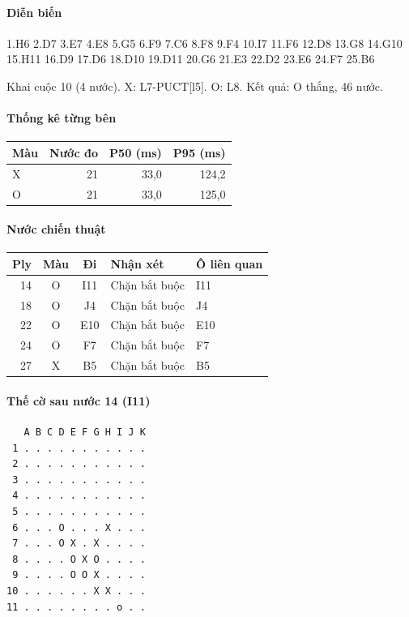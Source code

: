 \paragraph{Diễn biến}
{\footnotesize 1.H6 2.D7 3.E7 4.E8 5.G5 6.F9 7.C6 8.F8 9.F4 10.I7 11.F6 12.D8 13.G8 14.G10 15.H11 16.D9 17.D6 18.D10 19.D11 20.G6 21.E3 22.D2 23.E6 24.F7 25.B6\par}
Khai cuộc 10 (4 nước). X: L7-PUCT[l5]. O: L8. Kết quả: O thắng, 46 nước.
\paragraph{Thống kê từng bên}
\begin{center}\small
\begin{tabular}{@{}lrrr@{}}
\toprule
Màu & Nước đo & P50 (ms) & P95 (ms) \\
\midrule
X & 21 & 33,0 & 124,2 \\
O & 21 & 33,0 & 125,0 \\
\bottomrule
\end{tabular}
\end{center}
\paragraph{Nước chiến thuật}
\begin{center}\small
\begin{tabular}{@{}rccll@{}}
\toprule
Ply & Màu & Đi & Nhận xét & Ô liên quan \\
\midrule
14 & O & I11 & Chặn bắt buộc & I11 \\
18 & O & J4 & Chặn bắt buộc & J4 \\
22 & O & E10 & Chặn bắt buộc & E10 \\
24 & O & F7 & Chặn bắt buộc & F7 \\
27 & X & B5 & Chặn bắt buộc & B5 \\
\bottomrule
\end{tabular}
\end{center}
\paragraph{Thế cờ sau nước 14 (I11)}
\begin{verbatim}
   A B C D E F G H I J K
 1 . . . . . . . . . . .
 2 . . . . . . . . . . .
 3 . . . . . . . . . . .
 4 . . . . . . . . . . .
 5 . . . . . . . . . . .
 6 . . . O . . . X . . .
 7 . . . O X . X . . . .
 8 . . . . O X O . . . .
 9 . . . . O O X . . . .
10 . . . . . . X X . . .
11 . . . . . . . . o . .
\end{verbatim}

